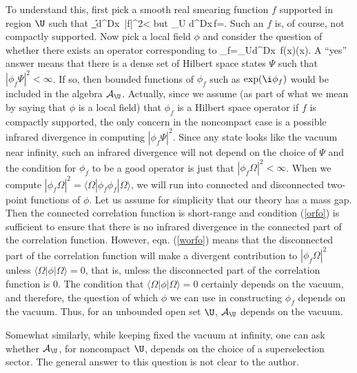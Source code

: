 \documentclass[12pt]{article}
\def\ra{\rangle}
\def\la{\langle}
\numberwithin{equation}{section}
\def\d{\mathrm d}
\def\A{{\mathcal A}}
\begin{document}
To understand this, first pick a  smooth real smearing function $f$ supported in region $\U$ such that
\be\label{orfo}\int_\U \d^Dx \,|f|^2<\infty\ee
but 
\be\label{worfo}\int_U \d^Dx\,f=\infty. \ee  Such an $f$ is, of course, not compactly supported.  
Now pick a local field $\phi$ and consider the question of whether there exists an operator corresponding to
\be\label{corfo}\phi_f=\int_U\d^Dx\, f(x)\phi(x). \ee
A ``yes'' answer means that there is a dense set of Hilbert space states $\Psi$ such that $|\phi_f\Psi|^2<\infty$. If so, then
bounded functions of $\phi_f$ such as $\exp(\i\phi_f)$ would be included in the algebra $\A_\U$.   Actually, 
since we assume (as part of what we mean by saying that $\phi$ is a local field) that $\phi_f$ is a Hilbert space operator
if $f$ is compactly supported, the only concern in the noncompact case is  a possible infrared divergence in computing $|\phi_f\Psi|^2$.
Since any state looks like the vacuum near infinity, such an infrared divergence will not depend on the choice of $\Psi$
and the condition for $\phi_f$ to be a good operator is just that $|\phi_f\Omega|^2<\infty$.
When we compute  $|\phi_f\Omega|^2=\la\Omega|\phi_f\phi_f|\Omega\ra$, we will run into connected and disconnected two-point functions of $\phi$.  Let us
assume for simplicity that our theory has a mass gap.  Then the connected correlation function is short-range and condition
(\ref{orfo}) is sufficient to ensure that there is no infrared divergence in the connected part of the correlation function.  However,
eqn. (\ref{worfo}) means that the disconnected part of the correlation function will make a divergent contribution to $|\phi_f\Omega|^2$
unless $\la\Omega|\phi|\Omega\ra=0$, that is, unless the disconnected part of the correlation function is 0.   The condition
that $\la\Omega|\phi|\Omega\ra=0$ certainly depends on the vacuum, and therefore, the question of which $\phi$ we can use in
constructing $\phi_f$ depends on the vacuum.    Thus, for an unbounded open set $\U$, $\A_\U$ depends on the vacuum.


Somewhat similarly, while keeping fixed the vacuum at infinity, one can ask whether $\A_\U$, for noncompact $\U$,
 depends on the choice of a superselection
sector.  The general answer to this question is not clear to the author.
\end{document}
